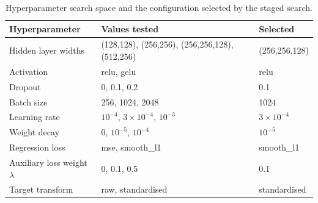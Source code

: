 \begin{table}[H]
\centering
\caption{Hyperparameter search space and the configuration selected by the staged search.}
\label{tab:tuning_space}
\begin{tabular}{lll}
\toprule
Hyperparameter & Values tested & Selected \\
\midrule
Hidden layer widths & (128,128), (256,256), (256,256,128), (512,256) & (256,256,128) \\
Activation & relu, gelu & relu \\
Dropout & 0, 0.1, 0.2 & 0.1 \\
Batch size & 256, 1024, 2048 & 1024 \\
Learning rate & $10^{-4}$, $3\times10^{-4}$, $10^{-3}$ & $3\times10^{-4}$ \\
Weight decay & 0, $10^{-5}$, $10^{-4}$ & $10^{-5}$ \\
Regression loss & mse, smooth\_l1 & smooth\_l1 \\
Auxiliary loss weight $\lambda$ & 0, 0.1, 0.5 & 0.1 \\
Target transform & raw, standardised & standardised \\
\bottomrule
\end{tabular}
\end{table}
